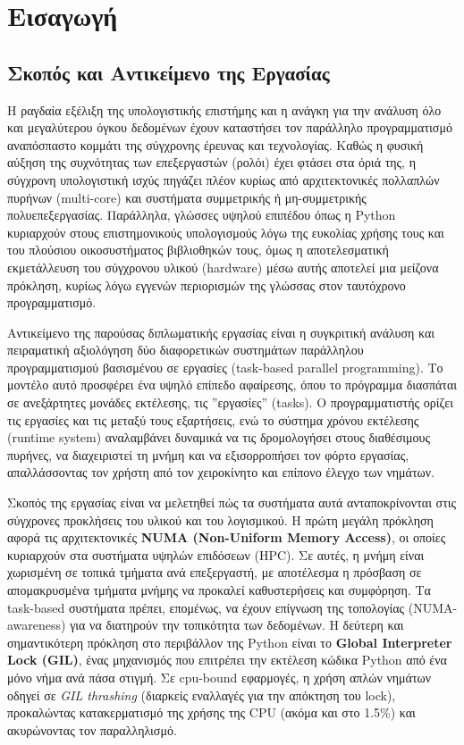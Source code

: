 
\chapter{Εισαγωγή}

\section{Σκοπός και Αντικείμενο της Εργασίας}

Η ραγδαία εξέλιξη της υπολογιστικής επιστήμης και η ανάγκη για την ανάλυση όλο και μεγαλύτερου όγκου δεδομένων έχουν καταστήσει τον παράλληλο προγραμματισμό αναπόσπαστο κομμάτι της σύγχρονης έρευνας και τεχνολογίας. Καθώς η φυσική αύξηση της συχνότητας των επεξεργαστών (ρολόι) έχει φτάσει στα όριά της, η σύγχρονη υπολογιστική ισχύς πηγάζει πλέον κυρίως από αρχιτεκτονικές πολλαπλών πυρήνων (multi-core) και συστήματα συμμετρικής ή μη-συμμετρικής πολυεπεξεργασίας. Παράλληλα, γλώσσες υψηλού επιπέδου όπως η Python κυριαρχούν στους επιστημονικούς υπολογισμούς λόγω της ευκολίας χρήσης τους και του πλούσιου οικοσυστήματος βιβλιοθηκών τους, όμως η αποτελεσματική εκμετάλλευση του σύγχρονου υλικού (hardware) μέσω αυτής αποτελεί μια μείζονα πρόκληση, κυρίως λόγω εγγενών περιορισμών της γλώσσας στον ταυτόχρονο προγραμματισμό.

Αντικείμενο της παρούσας διπλωματικής εργασίας είναι η συγκριτική ανάλυση και πειραματική αξιολόγηση δύο διαφορετικών συστημάτων παράλληλου προγραμματισμού βασισμένου σε εργασίες (task-based parallel programming). Το μοντέλο αυτό προσφέρει ένα υψηλό επίπεδο αφαίρεσης, όπου το πρόγραμμα διασπάται σε ανεξάρτητες μονάδες εκτέλεσης, τις ''εργασίες'' (tasks). Ο προγραμματιστής ορίζει τις εργασίες και τις μεταξύ τους εξαρτήσεις, ενώ το σύστημα χρόνου εκτέλεσης (runtime system) αναλαμβάνει δυναμικά να τις δρομολογήσει στους διαθέσιμους πυρήνες, να διαχειριστεί τη μνήμη και να εξισορροπήσει τον φόρτο εργασίας, απαλλάσσοντας τον χρήστη από τον χειροκίνητο και επίπονο έλεγχο των νημάτων.

Σκοπός της εργασίας είναι να μελετηθεί πώς τα συστήματα αυτά ανταποκρίνονται στις σύγχρονες προκλήσεις του υλικού και του λογισμικού. Η πρώτη μεγάλη πρόκληση αφορά τις αρχιτεκτονικές \textbf{NUMA (Non-Uniform Memory Access)}, οι οποίες κυριαρχούν στα συστήματα υψηλών επιδόσεων (HPC). Σε αυτές, η μνήμη είναι χωρισμένη σε τοπικά τμήματα ανά επεξεργαστή, με αποτέλεσμα η πρόσβαση σε απομακρυσμένα τμήματα μνήμης να προκαλεί καθυστερήσεις και συμφόρηση. Τα task-based συστήματα πρέπει, επομένως, να έχουν επίγνωση της τοπολογίας (NUMA-awareness) για να διατηρούν την τοπικότητα των δεδομένων. Η δεύτερη και σημαντικότερη πρόκληση στο περιβάλλον της Python είναι το \textbf{Global Interpreter Lock (GIL)}, ένας μηχανισμός που επιτρέπει την εκτέλεση κώδικα Python από ένα μόνο νήμα ανά πάσα στιγμή. Σε cpu-bound εφαρμογές, η χρήση απλών νημάτων οδηγεί σε \textit{GIL thrashing} (διαρκείς εναλλαγές για την απόκτηση του lock), προκαλώντας κατακερματισμό της χρήσης της CPU (ακόμα και στο 1.5\%) και ακυρώνοντας τον παραλληλισμό.

